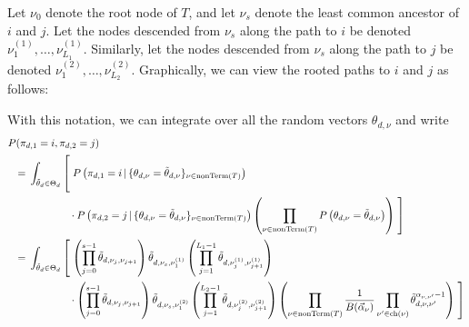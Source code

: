 \documentclass{article}
\theoremstyle{definition}
\newcommand{\nonTerm}{\text{nonTerm}}
\newcommand{\tallbracketl}[2]{\left #1 \rule{0ex}{#2} \right.}
\newcommand{\tallbracketr}[2]{\left. \rule{0ex}{#2} \right #1}
\begin{document}
Let $\nu_0$ denote the root node of $T$, and let $\nu_s$ denote the least common ancestor of $i$ and $j$.
Let the nodes descended from $\nu_s$ along the path to $i$ be denoted $\nu^{(1)}_1, \ldots, \nu^{(1)}_{L_1}$.
Similarly, let the nodes descended from $\nu_s$ along the path to $j$ be denoted $\nu^{(2)}_1, \ldots, \nu^{(2)}_{L_2}$.
Graphically, we can view the rooted paths to $i$ and $j$ as follows:
\begin{center}
\end{center}

With this notation, we can integrate over all the random vectors $\theta_{d,\nu}$ and write
{
\newcommand{\prefix}{\int_{\tilde \theta_d \in \Theta_d} \tallbracketl{[}{5ex}}
\begin{align*}
\MoveEqLeft
P(\pi_{d,1} = i, \pi_{d,2} = j)
\\
={}&
\prefix
  P\left(\pi_{d,1}=i \,|\, \{ \theta_{d,\nu} = \tilde \theta_{d,\nu} \}_{\nu \in \nonTerm(T)}\right)
\\ &\phantom{\prefix}
  \cdot P\left(\pi_{d,2}=j \,|\, \{ \theta_{d,\nu} = \tilde \theta_{d,\nu} \}_{\nu \in \nonTerm(T)}\right)
  \left(
    \prod_{\nu \in \nonTerm(T)} P\left(\theta_{d,\nu} = \tilde \theta_{d,\nu}\right)
  \right)
  \tallbracketr{]}{5ex}
\\
={}&
\prefix
  \left(
    \prod_{j=0}^{s-1} \tilde \theta_{d,\nu_j,\nu_{j+1}}
  \right)
  \tilde \theta_{d,\nu_s,\nu^{(1)}_1}
  \left(
    \prod_{j=1}^{L_1-1} \tilde \theta_{d,\nu^{(1)}_{j},\nu^{(1)}_{j+1}}
  \right)
\\ &\phantom{\prefix}
  \cdot
  \left(
    \prod_{j=0}^{s-1} \tilde \theta_{d,\nu_j,\nu_{j+1}}
  \right)
  \tilde \theta_{d,\nu_s,\nu^{(2)}_1}
  \left(
    \prod_{j=1}^{L_2-1} \tilde \theta_{d,\nu^{(2)}_{j},\nu^{(2)}_{j+1}}
  \right)
  \left(
    \prod_{\nu \in \nonTerm(T)}
    \frac{1}{B(\vec\alpha_\nu)}
    \prod_{\nu' \in \text{ch}(\nu)}
    \tilde \theta_{d,\nu,\nu'}^{\alpha_{\nu,\nu'}-1}
  \right)
  \tallbracketr{]}{5ex}
\end{align*}
}
\end{document}
